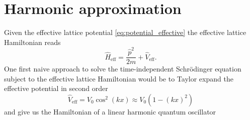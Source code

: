 \section{Harmonic approximation}

Given the effective lattice potential \cref{eq:potential_effective} the
effective lattice Hamiltonian reads
\begin{equation}
  \hat{H}_\text{eff}
  =\frac{\hat{p}^2}{2m}+\hat{V}_\text{eff}
  \label{eq:hamiltonian_effective}.
\end{equation}
One first naive approach to solve the time-independent Schrödinger equation
subject to the effective lattice Hamiltonian would be to Taylor expand
the effective potential in second order
\begin{equation}
  \hat{V}_\text{eff}
  =V_0\cos^2(kx)
  \approx V_0\left(1-(kx)^2\right)
  \label{eq:potential_harmonic_approximation}
\end{equation}
and give us the Hamiltonian of a linear harmonic quantum oscillator
